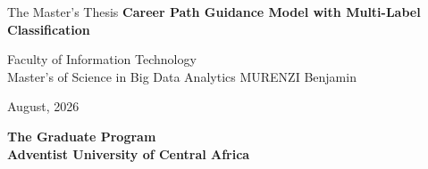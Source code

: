 \begin{titlepage}
    \begin{center}
    	\textmd{\large The Master's Thesis}  
        \vfill
        \textbf{\fontsize{21}{11}\selectfont Career Path Guidance Model with Multi-Label Classification}  
        \vfill
        
        \textnormal{\large Faculty of Information Technology\\Master's of Science in Big Data Analytics} 
        \vfill
        \textnormal{\Large MURENZI Benjamin}
        \vfill
        \vfill
        
        
        \textnormal{\large August, 2026}
        
        \textbf{\Large The Graduate Program \\ Adventist University of Central Africa}
        \vfill
    \end{center}
\end{titlepage}
